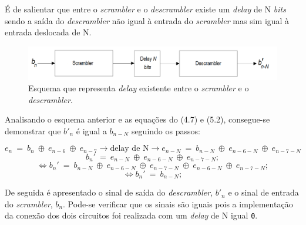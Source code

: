 \documentclass[11pt]{article}
\numberwithin{equation}{section}
\begin{document}
É de salientar que entre o \textit{scrambler} e o \textit{descrambler} existe um \textit{delay} de N \textit{bits} sendo a saída do \textit{descrambler} não igual à entrada do \textit{scrambler} mas sim igual à entrada deslocada de N.

\begin{figure}[H]
	\centering
	\includegraphics[keepaspectratio=true, scale=0.30]{teoricas/Ndelay}
	\caption{Esquema que representa \textit{delay} existente entre o \textit{scrambler} e o \textit{descrambler}.}
	\vspace{-0.8em}
\end{figure}

Analisando o esquema anterior e as equações do (4.7) e (5.2), consegue-se demonstrar que $b'_n$ é igual a $b_{n-N}$ seguindo os passos:

\vspace{-5mm}
\begin{equation}
e_n~= ~b_n~\oplus~e_{n-6}~\oplus~e_{n-7} \rightarrow \text{delay de N} \rightarrow e_{n-N}~= ~b_{n-N}~\oplus~e_{n-6-N}~\oplus~e_{n-7-N}
\end{equation}  
\vspace{-7.5mm}
\begin{equation}
 b_n'~= ~e_{n-N}~\oplus~e_{n-6-N}~\oplus~e_{n-7-N};
\end{equation}  
\vspace{-7.5mm}
\begin{equation}
\Leftrightarrow b_n'~= ~b_{n-N}~\oplus~e_{n-6-N}~\oplus~e_{n-7-N}~\oplus~e_{n-6-N}~\oplus~e_{n-7-N};
\end{equation}  
\vspace{-7.5mm}
\begin{equation}
\Leftrightarrow b_n'~= ~b_{n-N}; 
\end{equation}  

De seguida é apresentado o sinal de saída do \textit{descrambler}, $b'_n$ e o sinal de entrada do \textit{scrambler}, $b_n$. Pode-se verificar que os sinais são iguais pois a implementação da conexão dos dois circuitos foi realizada com um \textit{delay} de N igual \texttt{0}.
\end{document}
